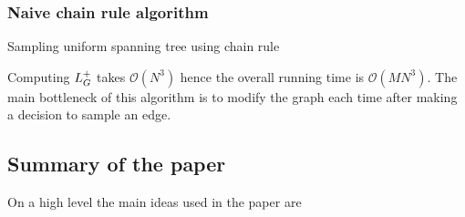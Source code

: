 


\subsubsection{Naive chain rule algorithm}




\begin{algorithm}[H]
 
 \caption{Sampling uniform spanning tree using chain rule}
\end{algorithm}

Computing $L_{G}^{+}$ takes $\mathcal{O}(N^3)$ hence the overall running time is $\mathcal{O}(MN^3)$. The main bottleneck of this algorithm is to modify the graph each time after making a decision to sample an edge.

\subsection{Summary of the paper}

On a high level the main ideas used in the paper are 


